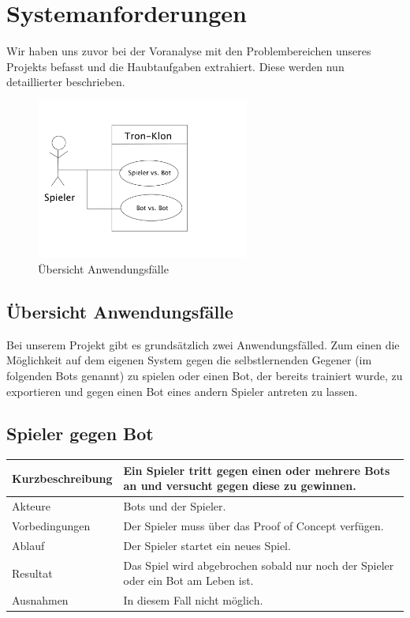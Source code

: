 \section{Systemanforderungen}

Wir haben uns zuvor bei der Voranalyse mit den Problembereichen unseres Projekts befasst und die Haubtaufgaben extrahiert. Diese werden nun detaillierter beschrieben. 

\begin{figure}[htb]

	\centering

	\includegraphics[width=7cm]{usecase.png}

	\caption{Übersicht Anwendungsfälle}

\end{figure}

\subsection{Übersicht Anwendungsfälle}

Bei unserem Projekt gibt es grundsätzlich zwei Anwendungsfälled. Zum einen die Möglichkeit auf dem eigenen System gegen die selbstlernenden Gegener (im folgenden Bots genannt) zu spielen oder einen Bot, der bereits trainiert wurde, zu exportieren und gegen einen Bot eines andern Spieler antreten zu lassen.

\subsection{Spieler gegen Bot}
\begin{tabularx}{\textwidth}{| X | X |}
	\hline
	Kurzbeschreibung & Ein Spieler tritt gegen einen oder mehrere Bots an und versucht gegen diese zu gewinnen. \\
	\hline
	Akteure & Bots und der Spieler. \\
	\hline
	Vorbedingungen & Der Spieler muss über das Proof of Concept verfügen. \\
	\hline
	Ablauf & Der Spieler startet ein neues Spiel.\\
	\hline
	Resultat & Das Spiel wird abgebrochen sobald nur noch der Spieler oder ein Bot am Leben ist. \\
	\hline
	Ausnahmen & In diesem Fall nicht möglich. \\
	\hline	
\end{tabularx}

